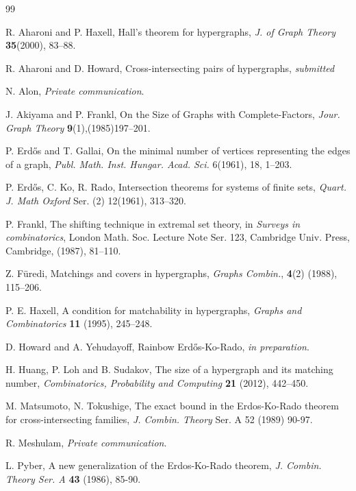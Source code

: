 \documentclass{amsart}
\theoremstyle{remark}
\begin{document}
\begin{thebibliography}{99}





R. Aharoni and P. Haxell, Hall's theorem for hypergraphs, {\it J. of
Graph Theory} {\bf 35}(2000), 83--88.

R. Aharoni and D. Howard, Cross-intersecting pairs of hypergraphs,
{\em submitted}

 N. Alon, {\em Private communication}.

J. Akiyama and P. Frankl, On the Size of Graphs with
Complete-Factors, \emph{Jour. Graph Theory} {\bf
9}(1),(1985)197--201.






P. Erd\H{o}s and  T. Gallai, On the minimal number of vertices
representing the edges of  a graph, \emph{Publ.  Math.  Inst.
Hungar. Acad. Sci.} 6(1961), 18, 1--203.

 P. Erd\H{o}s, C. Ko, R. Rado, Intersection theorems for systems of
finite sets, \emph{Quart. J. Math Oxford} Ser. (2) 12(1961),
313--320.


 P. Frankl,
The shifting technique in extremal set theory, in  {\em Surveys in
combinatorics}, London Math. Soc. Lecture Note Ser. 123,  Cambridge
Univ. Press, Cambridge, (1987), 81--110.





Z. F{\"u}redi, Matchings and covers in hypergraphs,
  {\em Graphs Combin.}, {\bf 4}(2) (1988), 115--206.


 P. E. Haxell, A condition for matchability in hypergraphs, {\em Graphs and
Combinatorics} {\bf 11} (1995), 245--248.

 D. Howard and A. Yehudayoff, Rainbow
Erd\H{o}s-Ko-Rado,  {\em in preparation}.

H. Huang, P. Loh and B. Sudakov, The size of a hypergraph and its
matching number, {\em Combinatorics, Probability and Computing} {\bf
21} (2012), 442--450.






M. Matsumoto, N. Tokushige, The exact bound in the Erdos-Ko-Rado
theorem for cross-intersecting families, \emph{J. Combin. Theory}
Ser. A 52 (1989) 90-97.

 R. Meshulam, {\em Private communication}.

 L. Pyber, A new generalization of the Erdos-Ko-Rado theorem, {\em J. Combin. Theory Ser. A} {\bf 43} (1986), 85-90.



\end{thebibliography}
\end{document}
